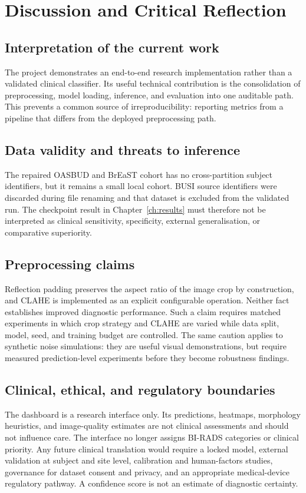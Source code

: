 \chapter{Discussion and Critical Reflection}

\section{Interpretation of the current work}
The project demonstrates an end-to-end research implementation rather than a validated clinical classifier. Its useful technical contribution is the consolidation of preprocessing, model loading, inference, and evaluation into one auditable path. This prevents a common source of irreproducibility: reporting metrics from a pipeline that differs from the deployed preprocessing path.

\section{Data validity and threats to inference}
The repaired OASBUD and BrEaST cohort has no cross-partition subject identifiers, but it remains a small local cohort. BUSI source identifiers were discarded during file renaming and that dataset is excluded from the validated run. The checkpoint result in Chapter~\ref{ch:results} must therefore not be interpreted as clinical sensitivity, specificity, external generalisation, or comparative superiority.

\section{Preprocessing claims}
Reflection padding preserves the aspect ratio of the image crop by construction, and CLAHE is implemented as an explicit configurable operation. Neither fact establishes improved diagnostic performance. Such a claim requires matched experiments in which crop strategy and CLAHE are varied while data split, model, seed, and training budget are controlled. The same caution applies to synthetic noise simulations: they are useful visual demonstrations, but require measured prediction-level experiments before they become robustness findings.

\section{Clinical, ethical, and regulatory boundaries}
The dashboard is a research interface only. Its predictions, heatmaps, morphology heuristics, and image-quality estimates are not clinical assessments and should not influence care. The interface no longer assigns BI-RADS categories or clinical priority. Any future clinical translation would require a locked model, external validation at subject and site level, calibration and human-factors studies, governance for dataset consent and privacy, and an appropriate medical-device regulatory pathway. A confidence score is not an estimate of diagnostic certainty.

